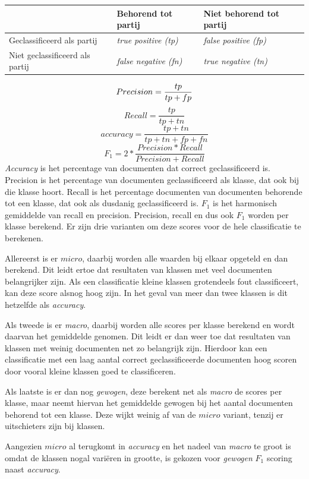 \begin{table}[H]
\label{tab:scores}
\centering
\begin{tabular}{l|l|l}
 & Behorend tot partij & Niet behorend tot partij\\ \hline
Geclassificeerd als partij &   \textit{true positive (tp)} & \textit{false positive (fp)} \\ \hline
Niet geclassificeerd als partij & \textit{false negative (fn)} & \textit{true negative (tn)} \\
\end{tabular}
\end{table}
\begin{equation}
    Precision = \frac{tp}{tp + fp}\\
\end{equation}
\begin{equation}
    Recall = \frac{tp}{tp + tn}
\end{equation}
\begin{equation}
    accuracy = \frac{tp + tn}{tp + tn + fp + fn}
\end{equation}
\begin{equation}
    F_1 = 2 * \frac{Precision * Recall}{Precision + Recall}
\end{equation}
\textit{Accuracy} is het percentage van documenten dat correct geclassificeerd is. Precision is het percentage van documenten geclassificeerd als klasse, dat ook bij die klasse hoort. Recall is het percentage documenten van documenten behorende tot een klasse, dat ook als dusdanig geclassificeerd is. $F_1$ is het harmonisch gemiddelde van recall en precision. Precision, recall en dus ook $F_1$ worden per klasse berekend. Er zijn drie varianten om deze scores voor de hele classificatie te berekenen. \par
Allereerst is er $micro$, daarbij worden alle waarden bij elkaar opgeteld en dan berekend. Dit leidt ertoe dat resultaten van klassen met veel documenten belangrijker zijn. Als een classificatie kleine klassen grotendeels fout classificeert, kan deze score alsnog hoog zijn. In het geval van meer dan twee klassen is dit hetzelfde als \textit{accuracy}.\par 
Als tweede is er \textit{macro}, daarbij worden alle scores per klasse berekend en wordt daarvan het gemiddelde genomen. Dit leidt er dan weer toe dat resultaten van klassen met weinig documenten net zo belangrijk zijn. Hierdoor kan een classificatie met een laag aantal correct geclassificeerde documenten hoog scoren door vooral kleine klassen goed te classificeren.\par
Als laatste is er dan nog \textit{gewogen}, deze berekent net als \textit{macro} de scores per klasse, maar neemt hiervan het gemiddelde gewogen bij het aantal documenten behorend tot een klasse. Deze wijkt weinig af van de $micro$ variant, tenzij er uitschieters zijn bij klassen.\par
Aangezien $micro$ al terugkomt in \textit{accuracy} en het nadeel van \textit{macro} te groot is omdat de klassen nogal variëren in grootte, is gekozen voor \textit{gewogen} $F_1$ scoring naast \textit{accuracy}.
\bigskip

